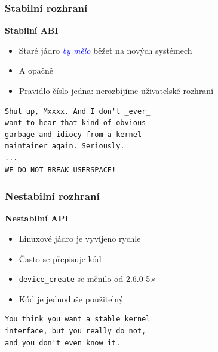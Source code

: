 \documentclass[xcolor=dvipsnames,handout]{beamer}
\let\Oldemph\emph
\renewcommand{\emph}[1]{\textcolor{blue}{\Oldemph{#1}}}
\newcommand{\heading}[1]{\textbf{\textcolor{BurntOrange}{#1}}}
\newcommand{\code}[2][]{\lstinline[columns=fullflexible, basicstyle=\ttfamily,
	#1]$#2$}
\begin{document}
\begin{frame}[fragile]
  \frametitle{Stabilní rozhraní}

  \heading{Stabilní ABI}
  \begin{itemize}
    \item Staré jádro \emph{by mělo} běžet na nových systémech
    \item A opačně

    \pause

    \item Pravidlo číslo jedna: nerozbíjíme uživatelské rozhraní
  \end{itemize}

\begin{verbatim}
Shut up, Mxxxx. And I don't _ever_
want to hear that kind of obvious
garbage and idiocy from a kernel
maintainer again. Seriously.
...
WE DO NOT BREAK USERSPACE!
\end{verbatim}

\end{frame}

\begin{frame}[fragile]
  \frametitle{Nestabilní rozhraní}

  \heading{Nestabilní API}
  \begin{itemize}
    \item Linuxové jádro je vyvíjeno rychle
    \item Často se přepisuje kód
    \item \code{device_create} se měnilo od 2.6.0 5$\times$ 
    \item Kód je jednoduše použitelný
  \end{itemize}

\begin{verbatim}
You think you want a stable kernel
interface, but you really do not,
and you don't even know it.
\end{verbatim}

\end{frame}
\end{document}
